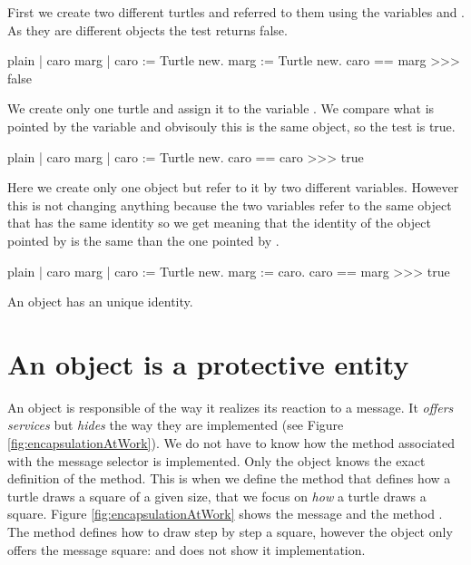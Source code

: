 \documentclass[10pt,twoside,english]{_support/latex/sbabook/sbabook}
\begin{document}
First we create two different turtles and referred to them using the variables  and . As they are different objects the test returns false.

\begin{displaycode}{plain}
| caro marg |
caro := Turtle new.
marg := Turtle new.
caro == marg
>>> false
\end{displaycode}

We create only one turtle and assign it to the variable . We compare what is pointed by the variable  and obvisouly this is the same object, so the test is true.

\begin{displaycode}{plain}
| caro marg |
caro := Turtle new.
caro == caro
>>>  true
\end{displaycode}

Here we create only one object but refer to it by two different variables. However this is not changing anything because the two variables refer to the same object that has the same identity so we get  meaning that the identity of the object pointed by  is the same than the one pointed by .

\begin{displaycode}{plain}
| caro marg |
caro := Turtle new.
marg := caro.
caro == marg
>>> true
\end{displaycode}

\begin{important}
An object has an unique identity.
\end{important}
\section{An object is a protective entity}
An object is responsible of the way it realizes its reaction to a
message.  It \textit{offers services} but \textit{hides} the way they are implemented (see Figure \ref{fig:encapsulationAtWork}). We do not have to know how the method associated with the message selector is implemented.  Only the object knows the exact definition of the method.  This is when we define the method  that defines how a turtle draws a square of a given size, that we focus on \textit{how} a turtle draws a square. Figure \ref{fig:encapsulationAtWork} shows the message and the method . The method  defines how to draw step by step a square, however the object only offers the message square: and does not show it implementation.
\end{document}
